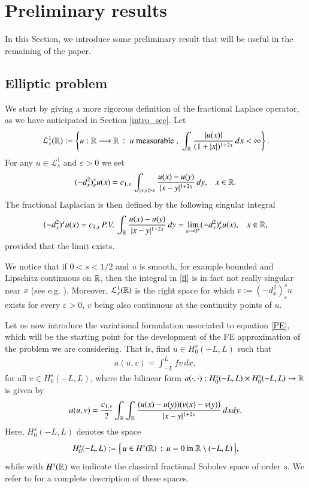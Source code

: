 \section{Preliminary results}\label{theor_sec}

In this Section, we introduce some preliminary result that will be useful in the remaining of the paper.

\subsection{Elliptic problem}

We start by giving a more rigorous definition of the fractional Laplace operator, as we have anticipated in Section \ref{intro_sec}. Let
\begin{align*}
	\mathcal L^1_s(\mathbb{R}) :=\left\{ u:\mathbb{R}\longrightarrow\mathbb{R}\,:\; u\textrm{ measurable },\;\int_{\mathbb{R}}\frac{|u(x)|}{(1+|x|)^{1+2s}}\,dx<\infty\right\}.
\end{align*}
For any $u\in\mathcal L_s^1$ and $\varepsilon>0$ we set 
\begin{align*}
	(-d_x^2)^s_{\varepsilon} u(x) = \ccs\,\int_{|x,y|>\varepsilon}\frac{u(x)-u(y)}{|x-y|^{1+2s}}\,dy,\;\;\; x\in\RR.
\end{align*}
The fractional Laplacian is then defined by the following singular integral
\begin{align}\label{fl}
	(-d_x^2)^{s}u(x) = c_{1,s}\,P.V.\,\int_{\mathbb{R}}\frac{u(x)-u(y)}{|x-y|^{1+2s}}\,dy = \lim_{\varepsilon\to 0^+} (-d_x^2)^s_{\varepsilon} u(x), \;\;\; x\in\mathbb{R},
\end{align}
provided that the limit exists. 

We notice that if $0<s<1/2$ and $u$ is smooth, for example bounded and Lipschitz continuous on $\mathbb{R}$, then the integral in \eqref{fl} is in fact not really singular near $x$ (see e.g. \cite[Remark 3.1]{dihitchhiker}). Moreover, $\mathcal L_s^1(\mathbb{R})$ is the right space for which $v:= (-d_x^2)^s_{\varepsilon} u$ exists for every $\varepsilon > 0$, $v$ being also continuous at the continuity points of $u$.

Let us now introduce the variational formulation associated to equation \eqref{PE}, which will be the starting point for the development of the FE approximation of the problem we are considering. That is, find $u\in H^s_0(-L,L)$ such that
\begin{align}\label{WF}
	a(u,v) = \int_{-L}^L fv\,dx,	
\end{align}
for all $v\in H_0^s(-L,L)$, where the bilinear form $a(\cdot,\cdot):H^s_0(-L,L)\times H^s_0(-L,L)\to \mathbb{R}$ is given by
\begin{align}\label{WF_bilinear}
	a(u,v)=\frac{c_{1,s}}{2} \int_{\mathbb{R}}\int_{\mathbb{R}}\frac{(u(x)-u(y))(v(x)-v(y))}{|x-y|^{1+2s}}\,dxdy.	
\end{align}
Here, $H^s_0(-L,L)$ denotes the space 
\begin{align*}
	H^s_0(-L,L) :=\Big\{\, u\in H^s(\mathbb{R})\,:\,u=0 \textrm{ in } \mathbb{R}\setminus(-L,L)\,\Big\}, 
\end{align*}
while with $H^s(\mathbb{R})$ we indicate the classical fractional Sobolev space of order $s$. We refer to \cite{dihitchhiker} for a complete description of these spaces.  

